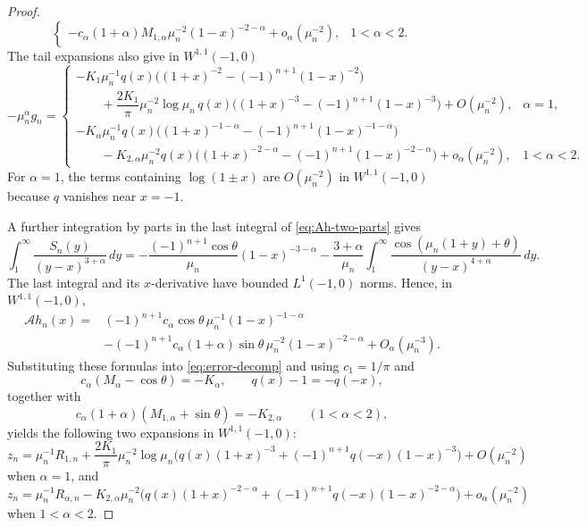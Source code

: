 \documentclass[11pt]{amsart}
\numberwithin{equation}{section}
\theoremstyle{remark}
\begin{document}
\begin{proof}
\[\begin{cases}
 -c_\alpha(1+\alpha)M_{1,\alpha}\mu_n^{-2}(1-x)^{-2-\alpha}
 +o_\alpha(\mu_n^{-2}),&1<\alpha<2.
 \end{cases}
\]
The tail expansions also give in $W^{1,1}(-1,0)$
\[
 -\mu_n^\alpha g_n=
 \begin{cases}
 -K_1\mu_n^{-1}q(x)\bigl((1+x)^{-2}-(-1)^{n+1}(1-x)^{-2}\bigr)\\
 \qquad+\dfrac{2K_1}{\pi}\mu_n^{-2}\log\mu_n\,
 q(x)\bigl((1+x)^{-3}-(-1)^{n+1}(1-x)^{-3}\bigr)
 +O(\mu_n^{-2}),&\alpha=1,\\[2mm]
 -K_\alpha\mu_n^{-1}q(x)\bigl((1+x)^{-1-\alpha}-(-1)^{n+1}(1-x)^{-1-\alpha}\bigr)\\
 \qquad-K_{2,\alpha}\mu_n^{-2}q(x)
 \bigl((1+x)^{-2-\alpha}-(-1)^{n+1}(1-x)^{-2-\alpha}\bigr)
 +o_\alpha(\mu_n^{-2}),&1<\alpha<2.
 \end{cases}
\]
For $\alpha=1$, the terms containing $\log(1\pm x)$ are
$O(\mu_n^{-2})$ in $W^{1,1}(-1,0)$ because $q$ vanishes near $x=-1$.

A further integration by parts in the last integral of
\eqref{eq:Ah-two-parts} gives
\[
 \int_1^\infty\frac{S_n(y)}{(y-x)^{3+\alpha}}\,dy
 =-\frac{(-1)^{n+1}\cos\theta}{\mu_n}(1-x)^{-3-\alpha}
 -\frac{3+\alpha}{\mu_n}\int_1^\infty
 \frac{\cos(\mu_n(1+y)+\theta)}{(y-x)^{4+\alpha}}\,dy.
\]
The last integral and its $x$-derivative have bounded $L^1(-1,0)$ norms.
Hence, in $W^{1,1}(-1,0)$,
\[
 \begin{aligned}
 \mathcal Ah_n(x)
 ={}&(-1)^{n+1}c_\alpha\cos\theta\,
 \mu_n^{-1}(1-x)^{-1-\alpha}\\
 &-(-1)^{n+1}c_\alpha(1+\alpha)\sin\theta\,
 \mu_n^{-2}(1-x)^{-2-\alpha}+O_\alpha(\mu_n^{-3}).
 \end{aligned}
\]
Substituting these formulas into \eqref{eq:error-decomp} and using $c_1=1/\pi$ and
\[
 c_\alpha(M_\alpha-\cos\theta)=-K_\alpha,
 \qquad q(x)-1=-q(-x),
\]
together with
\[
 c_\alpha(1+\alpha)(M_{1,\alpha}+\sin\theta)=-K_{2,\alpha}
 \qquad(1<\alpha<2),
\]
yields the following two expansions in $W^{1,1}(-1,0)$:
\[
 z_n=\mu_n^{-1}R_{1,n}
 +\frac{2K_1}{\pi}\mu_n^{-2}\log\mu_n
 \bigl(q(x)(1+x)^{-3}+(-1)^{n+1} q(-x)(1-x)^{-3}\bigr)
 +O(\mu_n^{-2})
\]
when $\alpha=1$, and
\[
 z_n=\mu_n^{-1}R_{\alpha,n}
 -K_{2,\alpha}\mu_n^{-2}
 \bigl(q(x)(1+x)^{-2-\alpha}
 +(-1)^{n+1} q(-x)(1-x)^{-2-\alpha}\bigr)
 +o_\alpha(\mu_n^{-2})
\]
when $1<\alpha<2$.


\end{proof}
\end{document}
